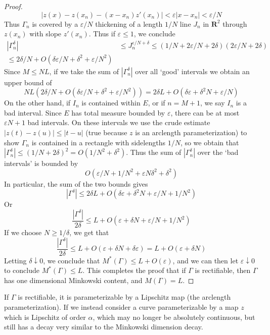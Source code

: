 \begin{proof}
  \[ |z(x) - z(x_n) - (x - x_n) z'(x_n)| < \varepsilon |x - x_n| < \varepsilon / N \]
  Thus $\Gamma_n$ is covered by a $\varepsilon / N$ thickening of a length $1/N$ line $J_n$ in $\mathbf{R}^2$ through $z(x_n)$ with slope $z'(x_n)$. Thus if $\varepsilon \leq 1$, we conclude
  \begin{align*}
    |\Gamma_n^\delta| &\leq J_n^{\varepsilon/N + \delta} \leq (1/N + 2\varepsilon/N + 2 \delta)(2\varepsilon/N + 2\delta)\\
    \leq 2 \delta/N + O(\delta \varepsilon / N + \delta^2 + \varepsilon/N^2)
  \end{align*}
  Since $M \leq NL$, if we take the sum of $|\Gamma_n^\delta|$ over all `good' intervals we obtain an upper bound of
  \[ NL \left( 2 \delta/N + O(\delta \varepsilon / N + \delta^2 + \varepsilon/N^2) \right) = 2 \delta L + O(\delta \varepsilon + \delta^2 N + \varepsilon/N) \]
  On the other hand, if $I_n$ is contained within $E$, or if $n = M+1$, we say $I_n$ is a bad interval. Since $E$ has total measure bounded by $\varepsilon$, there can be at most $\varepsilon N + 1$ bad intervals. On these intervals we use the crude estimate $|z(t) - z(u)| \leq |t-u|$ (true because $z$ is an arclength parameterization) to show $\Gamma_n$ is contained in a rectangle with sidelengths $1/N$, so we obtain that $|\Gamma_n^\delta| \leq (1/N + 2\delta)^2 = O(1/N^2 + \delta^2)$. Thus the sum of $|\Gamma_n^\delta|$ over the `bad intervals' is bounded by
  \[ O(\varepsilon/N + 1/N^2 + \varepsilon N \delta^2 + \delta^2) \]
  In particular, the sum of the two bounds gives
  \[ |\Gamma^\delta| \leq 2 \delta L + O(\delta \varepsilon + \delta^2 N + \varepsilon/N + 1/N^2) \]
  Or
  \[ \frac{|\Gamma^\delta|}{2 \delta} \leq L + O(\varepsilon + \delta N + \varepsilon/N + 1/N^2) \]
  If we choose $N \geq 1/\delta$, we get that
  \[ \frac{|\Gamma^\delta|}{2 \delta} \leq L + O(\varepsilon + \delta N + \delta \varepsilon) = L + O(\varepsilon + \delta N) \]
  Letting $\delta \downarrow 0$, we conclude that $M^*(\Gamma) \leq L + O(\varepsilon)$, and we can then let $\varepsilon \downarrow 0$ to conclude $M^*(\Gamma) \leq L$. This completes the proof that if $\Gamma$ is rectifiable, then $\Gamma$ has one dimensional Minkowski content, and $M(\Gamma) = L$.
\end{proof}

If $\Gamma$ is rectifiable, it is parameterizable by a Lipschitz map (the arclength parameterization). If we instead consider a curve parameterizable by a map $z$ which is Lipschitz of order $\alpha$, which may no longer be absolutely continuous, but still has a decay very similar to the Minkowski dimension decay.

